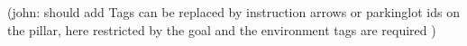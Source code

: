 \documentclass[journal]{IEEEtran}
\begin{document}
(john: should add Tags can be replaced by instruction arrows or parkinglot ids on the pillar, here restricted by the goal and the environment tags are required )
%
%



%
%
\end{document}
